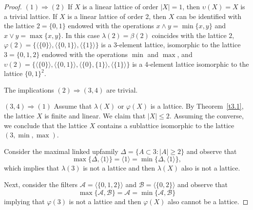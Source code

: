 \documentclass{amsart}
\theoremstyle{definition}
\begin{document}
\begin{proof} $(1){\Rightarrow}(2)$ If $X$ is a linear lattice of order $|X|=1$, then ${\upsilon}(X)=X$ is a trivial lattice. If $X$ is a linear lattice of order 2, then $X$ can be identified with the lattice $2=\{0,1\}$ endowed with the operations $x\wedge y=\min\{x,y\}$ and $x\vee y=\max\{x,y\}$. In this case $\lambda(2)=\beta(2)$ coincides with the lattice $2$, $\varphi(2)=\{{\langle}\{0\}{\rangle},{\langle}\{0,1\}{\rangle},{\langle}\{1\}{\rangle}\}$ is a 3-element lattice, isomorphic to the lattice $3=\{0,1,2\}$ endowed with the operations $\min$ and $\max$, and ${\upsilon}(2)=\big\{{\langle}\{0\}{\rangle},{\langle} \{0,1\}{\rangle},{\langle}\{0\},\{1\}{\rangle},{\langle}\{1\}{\rangle}\big\}$ is a 4-element lattice isomorphic to the lattice $\{0,1\}^2$.
\smallskip

The implications $(2){\Rightarrow}(3,4)$ are trivial.
\smallskip

$(3,4){\Rightarrow}(1)$ Assume that $\lambda(X)$ or $\varphi(X)$ is a lattice. By Theorem~\ref{t3.1}, the lattice $X$ is finite and linear.  We claim that $|X|\le 2$. Assuming the converse, we conclude that the lattice $X$ contains a sublattice isomorphic to the lattice $(3,\min,\max)$.

Consider the maximal linked upfamily $\Delta=\{A\subset 3:|A|\ge 2\}$ and observe that $$\max\{\Delta,{\langle} 1{\rangle}\}={\langle} 1{\rangle}=\min\{\Delta,{\langle} 1{\rangle}\},$$ which implies that $\lambda(3)$ is not a lattice and then $\lambda(X)$ also is not a lattice.

Next, consider the filters ${\mathcal A}={\langle}\{0,1,2\}{\rangle}$ and $\mathcal B={\langle}\{0,2\}{\rangle}$ and observe that $$\max\{{\mathcal A},\mathcal B\}={\mathcal A}=\min\{{\mathcal A},\mathcal B\}$$implying that $\varphi(3)$ is not a lattice and then $\varphi(X)$ also cannot be a lattice.
\end{proof}
\end{document}

